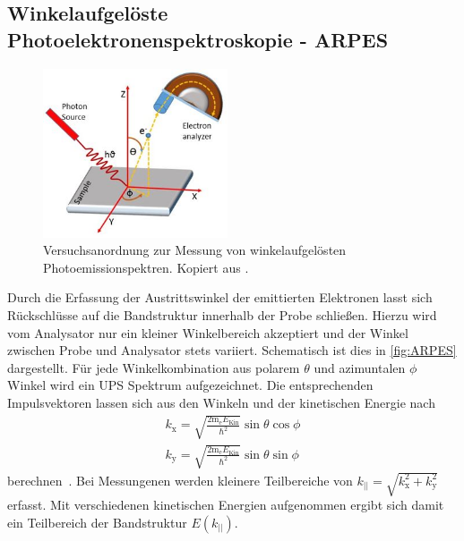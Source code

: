         \subsection{Winkelaufgelöste Photoelektronenspektroskopie - ARPES} \label{sec:ARPES}
            \begin{figure}
                \centering
                \includegraphics[height=5cm]{ARPES.jpg}
                \caption{Versuchsanordnung zur Messung von winkelaufgelösten Photoemissionspektren. Kopiert aus \cite{ARPES}.}
                \label{fig:ARPES}
            \end{figure}
            Durch die Erfassung der Austrittswinkel der emittierten Elektronen lasst sich Rückschlüsse auf die Bandstruktur innerhalb der Probe schließen.
            Hierzu wird vom Analysator nur ein kleiner Winkelbereich akzeptiert und der Winkel zwischen Probe und Analysator stets variiert.
            Schematisch ist dies in \autoref{fig:ARPES} dargestellt.
            Für jede Winkelkombination aus polarem $\theta$ und azimuntalen $\phi$ Winkel wird ein UPS Spektrum aufgezeichnet.
            Die entsprechenden Impulsvektoren lassen sich aus den Winkeln und der kinetischen Energie nach
            \begin{gather}
                k_\text{x} = \sqrt{\frac{2 \text{m}_\text{e} E_\text{Kin}}{\hbar^2}} \sin\theta \cos\phi \\
                k_\text{y} = \sqrt{\frac{2 \text{m}_\text{e} E_\text{Kin}}{\hbar^2}} \sin\theta \sin\phi
            \end{gather}
            berechnen~\cite{MM_4}.
            Bei Messungenen werden kleinere Teilbereiche von $k_\text{||} = \sqrt{k_\text{x}^2 + k_\text{y}^2}$ erfasst.
            Mit verschiedenen kinetischen Energien aufgenommen ergibt sich damit ein Teilbereich der Bandstruktur $E(k_\text{||})$.
